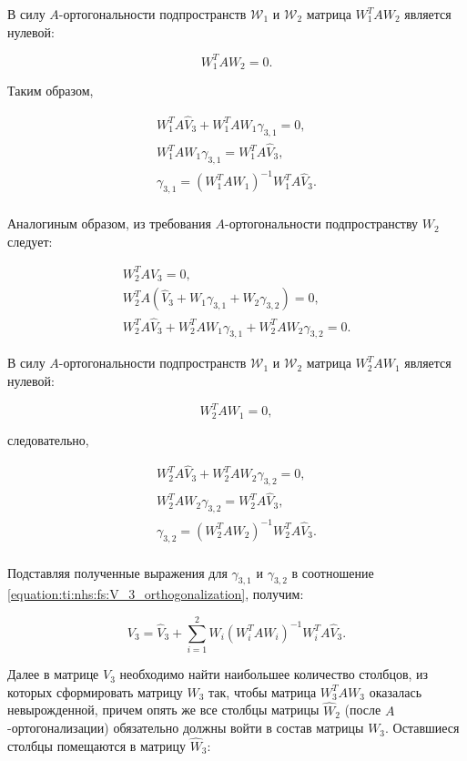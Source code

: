В силу $A$-ортогональности подпространств $\mathcal W_1$ и $\mathcal W_2$ матрица $W_1^T A W_2$ является нулевой:

$$
	W_1^T A W_2 = 0.
$$

Таким образом,

$$
	\begin{array}{c}
 		W_1^T A \widehat{V}_3 + W_1^T A W_1 \gamma_{3,1} = 0, \\
 		W_1^T A W_1 \gamma_{3,1} = W_1^T A \widehat{V}_3, \\
 		\gamma_{3,1} = \left ( W_1^T A W_1 \right ) ^{-1} W_1^T A \widehat{V}_3. \\
	\end{array}
$$

Аналогиным образом, из требования $A$-ортогональности подпространству $W_2$ следует:

$$
	\begin{array}{c}
		W_2^T A V_3 = 0, \\
 		W_2^T A ( \widehat{V}_3 + W_1 \gamma_{3,1} + W_2 \gamma_{3,2} ) = 0, \\
 		W_2^T A \widehat{V}_3 + W_2^T A W_1 \gamma_{3,1} + W_2^T A W_2 \gamma_{3,2} = 0.
	\end{array}
$$

В силу $A$-ортогональности подпространств $\mathcal W_1$ и $\mathcal W_2$ матрица $W_2^T A W_1$ является нулевой:

$$
	W_2^T A W_1 = 0,
$$

следовательно,

$$
	\begin{array}{c}
 		W_2^T A \widehat{V}_3 + W_2^T A W_2 \gamma_{3,2} = 0, \\
 		W_2^T A W_2 \gamma_{3,2} = W_2^T A \widehat{V}_3, \\
 		\gamma_{3,2} = \left ( W_2^T A W_2 \right ) ^{-1} W_2^T A \widehat{V}_3. \\
	\end{array}
$$

Подставляя полученные выражения для $\gamma_{3,1}$ и $\gamma_{3,2}$ в соотношение \ref{equation:ti:nhs:fs:V_3_orthogonalization}, получим:

$$
	V_3 = \widehat{V}_3 + \sum_{i=1}^2 W_i \left ( W_i^T A W_i \right ) ^{-1} W_i^T A \widehat{V}_3.
$$

Далее в матрице $V_3$ необходимо найти наибольшее количество столбцов, из которых сформировать матрицу $W_3$ так, чтобы матрица
$W_3^T A W_3$ оказалась невырожденной, причем опять же все столбцы матрицы $\widehat{W}_2$ (после $A$-ортогонализации) обязательно должны
войти в состав матрицы $W_3$. Оставшиеся столбцы помещаются в матрицу $\widehat{W}_3$:

